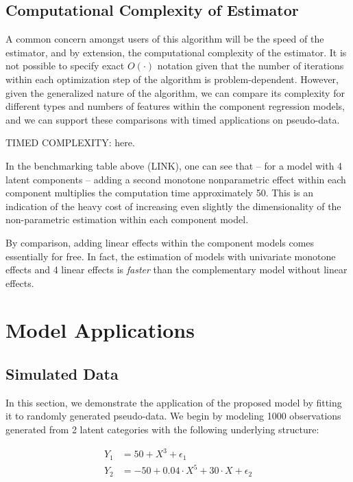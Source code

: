 \documentclass[fleqn,10pt]{olplainarticle}\usepackage[]{graphicx}\usepackage[]{color}
\begin{document}
\subsection{Computational Complexity of Estimator} \label{seccomplex}

A common concern amongst users of this algorithm will be the speed of the estimator, and by extension, the computational complexity of the estimator. It is not possible to specify exact $O(\cdot)$ notation given that the number of iterations within each optimization step of the algorithm is problem-dependent. However, given the generalized nature of the algorithm, we can compare its complexity for different types and numbers of features within the component regression models, and we can support these comparisons with timed applications on pseudo-data.

TIMED COMPLEXITY: here.



In the benchmarking table above (LINK), one can see that -- for a model with 4 latent components -- adding a second monotone nonparametric effect within each component multiplies the computation time approximately 50. This is an indication of the heavy cost of increasing even slightly the dimensionality of the non-parametric estimation within each component model.

By comparison, adding linear effects within the component models comes essentially for free. In fact, the estimation of models with univariate monotone effects and 4 linear effects is \emph{faster} than the complementary model without linear effects. 

\section{Model Applications}
\subsection{Simulated Data}

In this section, we demonstrate the application of the proposed model by fitting it to randomly generated pseudo-data. We begin by modeling 1000 observations generated from 2 latent categories with the following underlying structure:

\begin{align*}
  Y_{1} &= 50 + X^3 + \epsilon_1 \\
  Y_{2} &= -50 + 0.04 \cdot X^5 + 30 \cdot X + \epsilon_2 \\
\end{align*}
\end{document}
